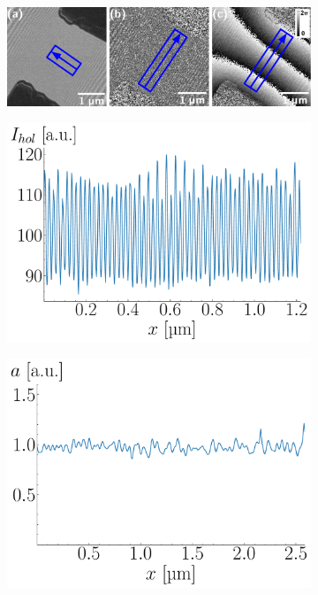 \begin{figure}[H]
\captionsetup{belowskip=0pt}
	\centering
	\begin{subfigure}[c]{\textwidth}
		\centering
		\includegraphics[width=\textwidth]{Figures/Holograms/Holograms.pdf}
	\end{subfigure}
	\hspace{-4mm}
	\begin{subfigure}[c]{0.3\textwidth}
		\centering
		\includegraphics[width=\textwidth]{Figures/Holograms/EH.pdf}
		\label{fig:EH}
	\end{subfigure}%
	\hspace{5mm}
	\begin{subfigure}[c]{0.3\textwidth}
		\centering
		\includegraphics[width=\textwidth]{Figures/Holograms/EH_AMP.pdf}

\end{subfigure}
\end{figure}
